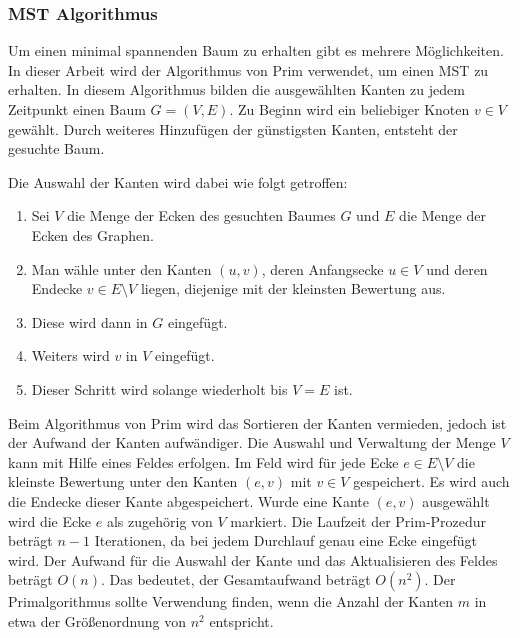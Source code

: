        
\subsubsection{MST Algorithmus}
\label{sec:2methoden}

\vspace{0.5cm}

Um einen minimal spannenden Baum zu erhalten gibt es mehrere Möglichkeiten.  In dieser Arbeit wird der Algorithmus von Prim verwendet, 
um einen MST zu erhalten.
In diesem Algorithmus bilden die ausgewählten Kanten zu jedem Zeitpunkt einen Baum  $G=(V,E)$. Zu Beginn wird ein 
beliebiger Knoten $v \in V$ gewählt. Durch weiteres Hinzufügen der günstigsten Kanten, entsteht der gesuchte Baum\cite{turau1}. 
\vspace{0.3cm}
\par Die Auswahl der Kanten wird dabei wie folgt getroffen:

\begin{enumerate}
 \item Sei $V$ die Menge der Ecken des gesuchten Baumes $G$ und $E$ die Menge der Ecken des Graphen.
 \item Man wähle unter den Kanten $(u,v)$, deren Anfangsecke $u \in V$ und deren Endecke $v \in E \setminus V$ liegen, diejenige mit der kleinsten
 Bewertung aus. 
\item Diese wird dann in $G$ eingefügt.
\item Weiters wird $v$ in $V$ eingefügt.
\item Dieser Schritt wird solange wiederholt bis $V=E$ ist.
 \end{enumerate}


Beim Algorithmus von Prim wird das Sortieren der Kanten vermieden, jedoch ist der Aufwand der Kanten aufwändiger. Die Auswahl und Verwaltung
der Menge $V$ kann mit Hilfe eines Feldes erfolgen. Im Feld wird für jede Ecke $e \in E\setminus V$ die kleinste Bewertung unter den Kanten $(e,v)$ mit 
$v \in V$ gespeichert. Es wird auch die Endecke dieser Kante abgespeichert.
Wurde eine Kante $(e,v)$ ausgewählt wird die Ecke $e$ als zugehörig 
von $V$ markiert.
Die Laufzeit der Prim-Prozedur beträgt $n-1$ Iterationen, da bei jedem Durchlauf genau eine Ecke eingefügt wird. Der Aufwand für die 
Auswahl der Kante und das Aktualisieren des Feldes beträgt $O(n)$. Das bedeutet, der Gesamtaufwand beträgt $O(n^2)$.
Der Primalgorithmus sollte Verwendung finden, wenn die Anzahl der Kanten $m$ in etwa der Größenordnung von $n^2$ entspricht\cite{turau1}. 


